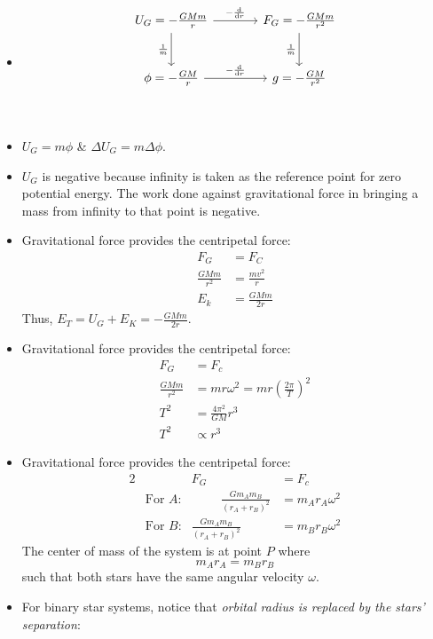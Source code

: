 \documentclass[oneside]{book}
\begin{document}
\begin{itemize}[label=\(\square\)]
    \item \[
\begin{tikzcd}[row sep=large, column sep=large]
     U_G=-\frac{GMm}{r} \arrow{r}{-\frac{\text{d}}{\text{d}r}} \arrow[swap]{d}{\frac{1}{m}} & F_G=-\frac{GMm}{r^2} \arrow[swap]{d}{\frac{1}{m}} \\
     \phi=-\frac{GM}{r} \arrow{r}{-\frac{\text{d}}{\text{d}r}} & g=-\frac{GM}{r^2}\\
\end{tikzcd}
\]
\item \(U_G=m\phi\) \& \(\Delta U_G=m\Delta\phi\).
\item \(U_G\) is negative because infinity is taken as the reference point for zero potential energy. The work done against gravitational force in bringing a mass from infinity to that point is negative.
\item Gravitational force provides the centripetal force:
\begin{align*}
    F_G&=F_C\\
    \frac{GMm}{r^2}&=\frac{mv^2}{r}\\
    E_k&=\frac{GMm}{2r}
\end{align*}
Thus, \(E_T=U_G+E_K=-\frac{GMm}{2r}\).
\item Gravitational force provides the centripetal force:
\begin{align*}
    F_G&=F_c\\
    \frac{GMm}{r^2}&=mr\omega^2=mr\left(\frac{2\pi}{T}\right)^2\\
    T^2&=\frac{4\pi^2}{GM}r^3\\
    T^2 &\propto r^3
\end{align*}
\item Gravitational force provides the centripetal force:
\begin{alignat*}{2}
    && F_G&=F_c\\
    &\text{For \(A\):}& \hspace{1cm} \frac{Gm_Am_B}{(r_A+r_B)^2}&=m_Ar_A\omega^2\\
    &\text{For \(B\):}& \frac{Gm_Am_B}{(r_A+r_B)^2}&=m_Br_B\omega^2
\end{alignat*}
The center of mass of the system is at point \(P\) where 
\[m_Ar_A=m_Br_B\]
such that both stars have the same angular velocity \(\omega\).
\item For binary star systems, notice that \emph{orbital radius is replaced by the stars' separation}:
\begin{align*}

\end{align*}
\end{itemize}
\end{document}
